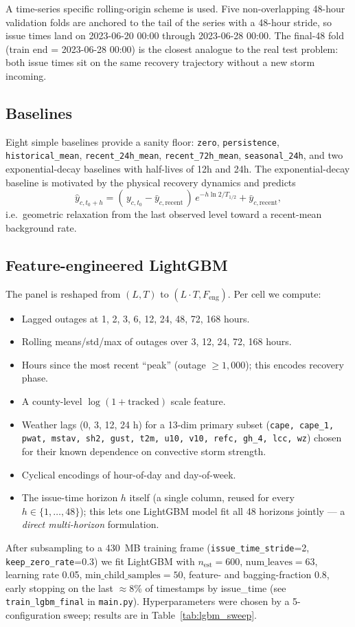 \documentclass[11pt]{article}
\begin{document}
A time-series specific rolling-origin scheme is used. Five non-overlapping
48-hour validation folds are anchored to the tail of the series with a
48-hour stride, so issue times land on
2023-06-20 00:00 through 2023-06-28 00:00. The final-48 fold (train end =
2023-06-28 00:00) is the closest analogue to the real test problem: both
issue times sit on the same recovery trajectory without a new storm
incoming.

\subsection{Baselines}

Eight simple baselines provide a sanity floor: \texttt{zero},
\texttt{persistence}, \texttt{historical\_mean},
\texttt{recent\_24h\_mean}, \texttt{recent\_72h\_mean},
\texttt{seasonal\_24h}, and two exponential-decay baselines with
half-lives of 12h and 24h. The exponential-decay baseline is motivated by
the physical recovery dynamics and predicts
\[
\hat y_{c,t_0+h} = (\,y_{c,t_0}-\bar y_{c,\text{recent}}\,)\,
e^{-h\ln 2 / T_{1/2}} + \bar y_{c,\text{recent}},
\]
i.e.\ geometric relaxation from the last observed level toward a
recent-mean background rate.

\subsection{Feature-engineered LightGBM}

The panel is reshaped from $(L,T)$ to $(L{\cdot}T, F_{\text{eng}})$. Per
cell we compute:
\begin{itemize}
  \item Lagged outages at 1, 2, 3, 6, 12, 24, 48, 72, 168 hours.
  \item Rolling means/std/max of outages over 3, 12, 24, 72, 168 hours.
  \item Hours since the most recent ``peak'' (outage $\ge 1{,}000$); this
        encodes recovery phase.
  \item A county-level $\log(1+\text{tracked})$ scale feature.
  \item Weather lags (0, 3, 12, 24 h) for a 13-dim primary subset
        (\texttt{cape, cape\_1, pwat, mstav, sh2, gust, t2m, u10, v10,
        refc, gh\_4, lcc, wz}) chosen for their known dependence on
        convective storm strength.
  \item Cyclical encodings of hour-of-day and day-of-week.
  \item The issue-time horizon $h$ itself (a single column, reused for
        every $h{\in}\{1,\dots,48\}$); this lets one LightGBM model fit
        all 48 horizons jointly --- a \emph{direct multi-horizon}
        formulation.
\end{itemize}
After subsampling to a 430~MB training frame (\texttt{issue\_time\_stride}=2,
\texttt{keep\_zero\_rate}=0.3) we fit LightGBM with
$n_{\text{est}}{=}600$, $\text{num\_leaves}{=}63$, learning rate 0.05,
$\text{min\_child\_samples}{=}50$, feature- and bagging-fraction 0.8,
early stopping on the last $\approx$8\% of timestamps by
issue\_time (see \texttt{train\_lgbm\_final} in \texttt{main.py}).
Hyperparameters were chosen by a 5-configuration sweep; results are in
Table~\ref{tab:lgbm_sweep}.
\end{document}
